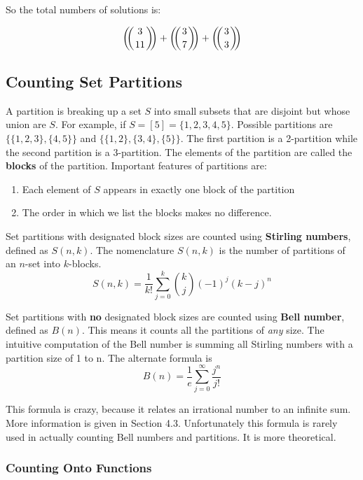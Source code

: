 \documentclass{article}
\begin{document}
So the total numbers of solutions is:

\begin{equation*}
    \multiset{3}{11} + \multiset{3}{7} + \multiset{3}{3}
\end{equation*}

\subsection{Counting Set Partitions}

A partition is breaking up a set $S$ into small subsets that are disjoint but whose union are $S$. For example, if $S = [5] = \{1,2,3,4,5\}$. Possible partitions are $\{\{1,2,3\},\{4,5\}\}$ and $\{\{1,2\},\{3,4\},\{5\}\}$. The first partition is a 2-partition while the second partition is a 3-partition. The elements of the partition are called the \textbf{blocks} of the partition. Important features of partitions are:

\begin{enumerate}
    \item Each element of $S$ appears in exactly one block of the partition
    \item The order in which we list the blocks makes no difference.
\end{enumerate}

Set partitions with designated block sizes are counted using \textbf{Stirling numbers}, defined as $S(n,k)$. The nomenclature $S(n,k)$ is the number of partitions of an $n$-set into $k$-blocks.
\begin{equation*}
    S(n,k) = \dfrac{1}{k!} \sum_{j=0}^{k} \binom{k}{j} (-1)^j (k-j)^n
\end{equation*}

Set partitions with \textbf{no} designated block sizes are counted using \textbf{Bell number}, defined as $B(n)$. This means it counts all the partitions of \textit{any} size. The intuitive computation of the Bell number is summing all Stirling numbers with a partition size of 1 to n. The alternate formula is
\begin{equation*}
    B(n) = \dfrac{1}{e} \sum_{j=0}^{\infty} \dfrac{j^n}{j!}
\end{equation*}

This formula is crazy, because it relates an irrational number to an infinite sum. More information is given in Section 4.3. Unfortunately this formula is rarely used in actually counting Bell numbers and partitions. It is more theoretical.

\subsubsection{Counting Onto Functions}
\end{document}
